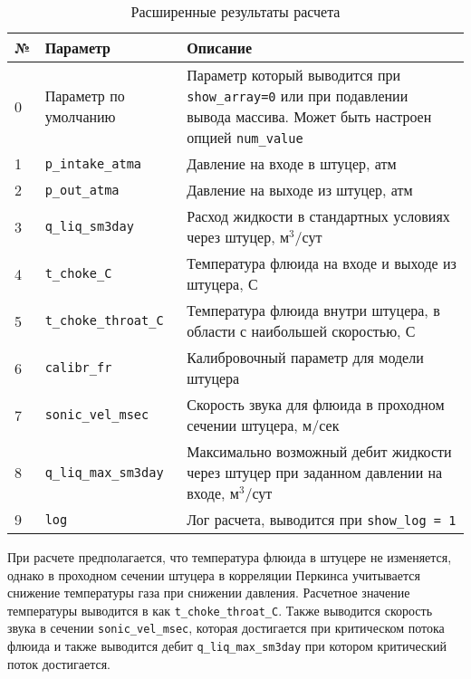 \begin{table}[H]
	\caption{Расширенные результаты расчета}
	\label{table:param_list_1}
	\begin{tabular}{p{}p{}p{}}
		\hline
		№& Параметр & Описание  \\ \hline
		0 & Параметр по умолчанию & Параметр который выводится при \texttt{show_array=0} или при подавлении вывода массива. Может быть настроен опцией  \texttt{num_value}    \\ \hline
		
		1 & \texttt{p_intake_atma} & Давление на входе в штуцер, атм    \\ \hline
		2 & \texttt{p_out_atma} & Давление на выходе из штуцер, атм    \\ \hline
		3 & \texttt{q_liq_sm3day} & Расход жидкости в стандартных условиях через штуцер, м$^3$/сут    \\ \hline
		4 & \texttt{t_choke_C} & Температура флюида на входе и выходе из штуцера, С  \\ \hline
		5 & \texttt{t_choke_throat_C} & Температура флюида внутри штуцера, в области с наибольшей скоростью, С  \\ \hline
		6 & \texttt{calibr_fr} & Калибровочный параметр для модели штуцера  \\ \hline
		7 & \texttt{sonic_vel_msec} & Скорость звука для флюида в проходном сечении штуцера, м/сек  \\ \hline
		8 & \texttt{q_liq_max_sm3day} & Максимально возможный дебит жидкости через штуцер при заданном давлении на входе, м$^3$/сут  \\ \hline
		9 & \texttt{log} & Лог расчета, выводится при \texttt{show_log = 1}  \\ \hline
		
	\end{tabular}
\end{table}

При расчете предполагается, что температура флюида в штуцере не изменяется, однако в проходном сечении штуцера в корреляции Перкинса учитывается снижение температуры газа при снижении давления. Расчетное значение температуры выводится в как  \texttt{t_choke_throat_C}. Также выводится скорость звука в сечении \texttt{sonic_vel_msec}, которая достигается при критическом потока флюида и также выводится дебит \texttt{q_liq_max_sm3day} при котором критический поток достигается. 



